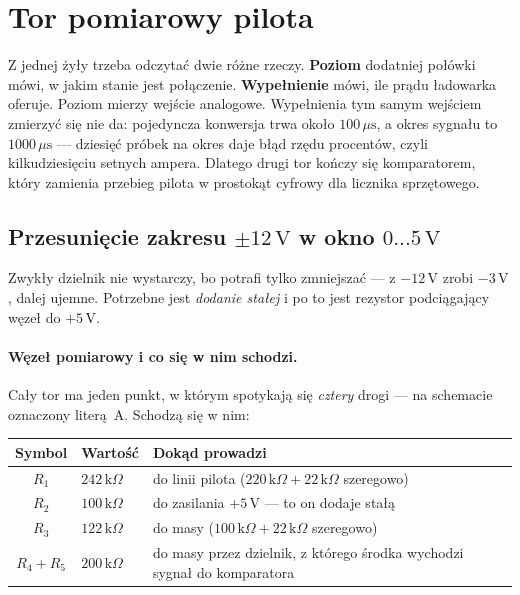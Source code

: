 \documentclass[a4paper,11pt]{article}
\newcommand{\kohm}{\,\mathrm{k}\Omega}
\newcommand{\volt}{\,\mathrm{V}}
\newcommand{\us}{\,\mu\mathrm{s}}
\begin{document}
\section{Tor pomiarowy pilota}
\label{sec:pomiar}

Z jednej żyły trzeba odczytać dwie różne rzeczy. \textbf{Poziom} dodatniej połówki
mówi, w jakim stanie jest połączenie. \textbf{Wypełnienie} mówi, ile prądu
ładowarka oferuje. Poziom mierzy wejście analogowe. Wypełnienia tym samym wejściem
zmierzyć się nie da: pojedyncza konwersja trwa około $100\us$, a okres sygnału to
$1000\us$ --- dziesięć próbek na okres daje błąd rzędu procentów, czyli
kilkudziesięciu setnych ampera. Dlatego drugi tor kończy się komparatorem, który
zamienia przebieg pilota w prostokąt cyfrowy dla licznika sprzętowego.

\subsection{Przesunięcie zakresu \texorpdfstring{$\pm12\volt$}{+/-12 V} w okno
\texorpdfstring{$0\ldots5\volt$}{0...5 V}}

Zwykły dzielnik nie wystarczy, bo potrafi tylko zmniejszać --- z $-12\volt$ zrobi
$-3\volt$, dalej ujemne. Potrzebne jest \emph{dodanie stałej} i po to jest rezystor
podciągający węzeł do $+5\volt$.

\paragraph{Węzeł pomiarowy i co się w nim schodzi.} Cały tor ma jeden punkt,
w którym spotykają się \emph{cztery} drogi --- na schemacie oznaczony literą~A.
Schodzą się w nim:

\begin{center}
\begin{tabular}{clp{7.4cm}}
\toprule
Symbol & Wartość & Dokąd prowadzi \\
\midrule
$R_1$ & $242\kohm$ & do linii pilota ($220\kohm + 22\kohm$ szeregowo) \\
$R_2$ & $100\kohm$ & do zasilania $+5\volt$ --- to on dodaje stałą \\
$R_3$ & $122\kohm$ & do masy ($100\kohm + 22\kohm$ szeregowo) \\
$R_4+R_5$ & $200\kohm$ & do masy przez dzielnik, z którego środka wychodzi sygnał
  do komparatora \\
\bottomrule
\end{tabular}
\end{center}
\end{document}
